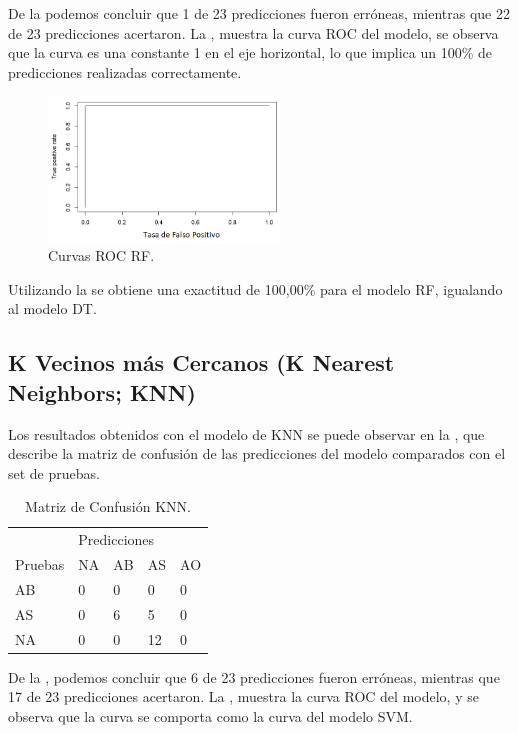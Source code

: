 \documentclass{textolivre}
\begin{document}
De la  podemos concluir que 1 de 23 predicciones fueron erróneas, mientras que 22 de 23 predicciones acertaron. La , muestra la curva ROC del modelo, se observa que la curva es una constante 1 en el eje horizontal, lo que implica un 100\% de predicciones realizadas correctamente.

\begin{figure}[htbp]
 \centering
 \includegraphics[width=0.55\textwidth]{figura12.png}
 \caption{Curvas ROC RF.}
 \label{figura12}
\end{figure}

Utilizando la  se obtiene una exactitud de 100,00\% para el modelo RF, igualando al modelo DT.

\subsection{K Vecinos más Cercanos (K Nearest Neighbors; KNN)}
Los resultados obtenidos con el modelo de KNN  se puede observar en la , que describe la matriz de confusión de las predicciones del modelo comparados con el set de pruebas.

\begin{table}[htpb]
\centering
\caption{Matriz de Confusión KNN.}
\label{tab8}
\begin{tabular}{lllll}
\toprule 
 & \multicolumn{4}{l}{Predicciones}   \\ 
\cmidrule{2-5}
Pruebas        & NA      & AB       & AS       & AO
\\ 
\midrule
AB             & 0       & 0        & 0        & 0
\\ 
AS             & 0       & 6        & 5        & 0
\\
NA             & 0       & 0        & 12       & 0
\\
\bottomrule
\end{tabular}
\end{table}

De la ,  podemos concluir que 6 de 23 predicciones fueron erróneas, mientras que 17 de 23 predicciones acertaron. La , muestra la curva ROC del modelo, y se observa que la curva se comporta como la curva del modelo SVM.
\end{document}
